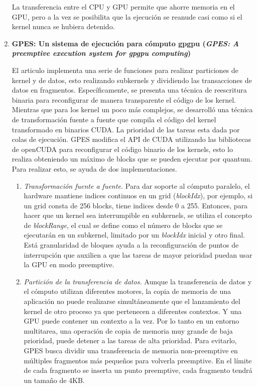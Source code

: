 \begin{enumerate}
La transferencia entre el CPU y GPU permite que ahorre memoria en el GPU, pero a la vez se posibilita que la ejecución se reanude casi como si el kernel nunca se hubiera detenido.

\item \textbf{GPES: Un sistema de ejecución para cómputo gpgpu
	(\textit{GPES: A preemptive execution system for gpgpu computing})}
	
	El articulo \cite{GPES} implementa una serie de funciones para realizar particiones de kernel y de datos, esto realizando subkernels y dividiendo las transacciones de datos en fragmentos. 
Específicamente, se presenta una técnica de reescritura binaria para reconfigurar de manera transparente el código de los kernel. Mientras que para los kernel un poco más complejos, se desarrolló una técnica de transformación fuente a fuente que compila el código del kernel transformado en binarios CUDA. La prioridad de las tareas esta dada por colas de ejecución. GPES modifica el API de CUDA utilizando las bibliotecas de openCUDA para reconfigurar el código binario de los kernels, esto lo realiza obteniendo un máximo de blocks que se pueden ejecutar por quantum. Para realizar esto, se ayuda de dos implementaciones.

\begin{enumerate}
\item \textit{Transformación fuente a fuente.}
Para dar soporte al cómputo paralelo, el hardware mantiene indices continuos en un grid (\textit{blockIdx}), por ejemplo, si un grid consta de 256 blocks, tiene indices desde 0 a 255. Entonces, para hacer que un kernel sea interrumpible en subkernels, se utiliza el concepto de \textit{blockRange}, el cual se define como el número de blocks que se ejecutarán en un subkernel, limitado por un \textit{blockIdx} inicial y otro final. Está granularidad de bloques ayuda a la reconfiguración de puntos de interrupción que auxilien a que las tareas de mayor prioridad puedan usar la GPU en modo preemptive.

\item \textit{Partición de la transferencia de datos.}
Aunque la transferencia de datos y el cómputo utilizan diferentes motores, la copia de memoria de una aplicación no puede realizarse simultáneamente que el lanzamiento del kernel de otro proceso ya que pertenecen a diferentes contextos. Y una GPU puede contener un contexto a la vez. Por lo tanto en un entorno multitarea, una operación de copia de memoria muy grande de baja prioridad, puede detener a las tareas de alta prioridad. Para evitarlo, GPES busca dividir una transferencia de memoria non-preemptive en múltiples fragmentos más pequeños para volverla preemptive. En el límite de cada fragmento se inserta un punto preemptive, cada fragmento tendrá un tamaño de 4KB.


\end{enumerate}
\end{enumerate}

